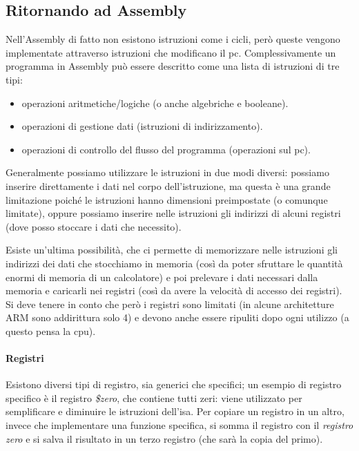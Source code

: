 \documentclass[class=book, crop=false, oneside]{standalone}
\begin{document}
\subsection*{Ritornando ad Assembly}
Nell’Assembly di fatto non esistono istruzioni come i cicli, però queste vengono implementate attraverso istruzioni che modificano il \acrfull{pc}.
Complessivamente un programma in Assembly può essere descritto come una lista di istruzioni di tre tipi:
\begin{itemize}[noitemsep]
	\item operazioni aritmetiche/logiche (o anche algebriche e booleane).
	\item operazioni di gestione dati (istruzioni di indirizzamento).
	\item operazioni di controllo del flusso del programma (operazioni sul \acrshort{pc}).
\end{itemize}
Generalmente possiamo utilizzare le istruzioni in due modi diversi: possiamo inserire direttamente i dati nel corpo dell'istruzione, ma questa è una grande limitazione poiché le istruzioni hanno dimensioni preimpostate (o comunque limitate), oppure possiamo inserire nelle istruzioni gli indirizzi di alcuni registri (dove posso stoccare i dati che necessito).

Esiste un'ultima possibilità, che ci permette di memorizzare nelle istruzioni gli indirizzi dei dati che stocchiamo in memoria (così da poter sfruttare le quantità enormi di memoria di un calcolatore) e poi prelevare i dati necessari dalla memoria e caricarli nei registri (così da avere la velocità di accesso dei registri).\\
Si deve tenere in conto che però i registri sono limitati (in alcune architetture ARM sono addirittura solo 4) e devono anche essere ripuliti dopo ogni utilizzo (a questo pensa la \acrshort{cpu}).

\paragraph*{Registri}
Esistono diversi tipi di registro, sia generici che specifici; un esempio di registro specifico è il registro \emph{\$zero}, che contiene tutti zeri: viene utilizzato per semplificare e diminuire le istruzioni dell’\acrshort{isa}. Per copiare un registro in un altro, invece che implementare una funzione specifica, si somma il registro con il \emph{registro zero} e si salva il risultato in un terzo registro (che sarà la copia del primo).
\end{document}
